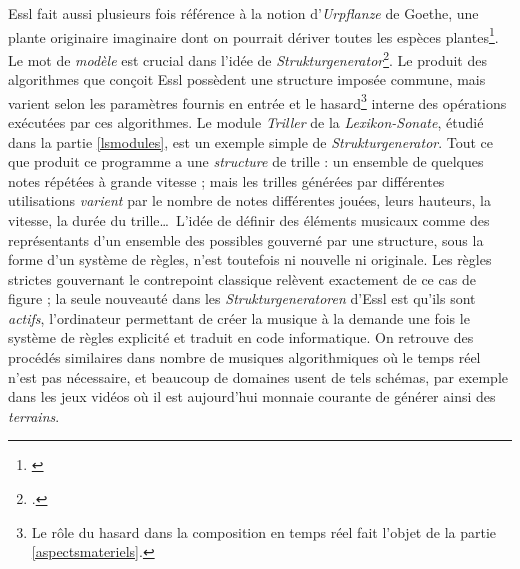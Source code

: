 \documentclass[a4paper,12pt]{article}
\begin{document}
Essl fait aussi plusieurs fois référence à la notion d'\emph{Urpflanze} de Goethe, une plante originaire imaginaire dont on pourrait dériver toutes les espèces plantes\footnote{\cite{goethe1993italienische}}. Le mot de \emph{modèle} est crucial dans l'idée de \emph{Strukturgenerator}\footnote{\cite{strukturgeneratoren}.}. Le produit des algorithmes que conçoit Essl possèdent une structure imposée commune, mais varient selon les paramètres fournis en entrée et le hasard\footnote{Le rôle du hasard dans la composition en temps réel fait l'objet de la partie \ref{aspectsmateriels}.} interne des opérations exécutées par ces algorithmes. Le module \emph{Triller} de la \emph{Lexikon-Sonate}, étudié dans la partie \ref{lsmodules}, est un exemple simple de \emph{Strukturgenerator}. Tout ce que produit ce programme a une \emph{structure} de trille : un ensemble de quelques notes répétées à grande vitesse ; mais les trilles générées par différentes utilisations \emph{varient} par le nombre de notes différentes jouées, leurs hauteurs, la vitesse, la durée du trille\dots~L'idée de définir des éléments musicaux comme des représentants d'un ensemble des possibles gouverné par une structure, sous la forme d'un système de règles, n'est toutefois ni nouvelle ni originale. Les règles strictes gouvernant le contrepoint classique relèvent exactement de ce cas de figure ; la seule nouveauté dans les \emph{Strukturgeneratoren} d'Essl est qu'ils sont \emph{actifs}, l'ordinateur permettant de créer la musique à la demande une fois le système de règles explicité et traduit en code informatique. On retrouve des procédés similaires dans nombre de musiques algorithmiques où le temps réel n'est pas nécessaire, et beaucoup de domaines usent de tels schémas, par exemple dans les jeux vidéos où il est aujourd'hui monnaie courante de générer ainsi des \emph{terrains}. \\
\end{document}

